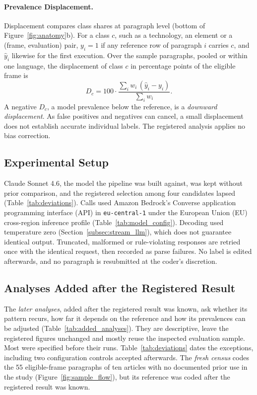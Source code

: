\paragraph{Prevalence Displacement.} Displacement compares class shares at paragraph level (bottom of Figure~\ref{fig:anatomy}b). For a class $c$, such as a technology, an element or a (frame, evaluation) pair, $y_i = 1$ if any reference row of paragraph $i$ carries $c$, and $\hat{y}_i$ likewise for the first execution. Over the sample paragraphs, pooled or within one language, the displacement of class $c$ in percentage points of the eligible frame is
\begin{equation}
D_c = 100 \cdot \frac{\sum_i w_i\,(\hat{y}_i - y_i)}{\sum_i w_i}.
\label{eq:displacement}
\end{equation}
A negative $D_c$, a model prevalence below the reference, is a \emph{downward displacement}. As false positives and negatives can cancel, a small displacement does not establish accurate individual labels. The registered analysis applies no bias correction.

\subsection{Experimental Setup}\label{subsec:experimental_setup}

Claude Sonnet 4.6, the model the pipeline was built against, was kept without prior comparison, and the registered selection among four candidates lapsed (Table~\ref{tab:deviations}). Calls used Amazon Bedrock's Converse application programming interface (API) in \texttt{eu-central-1} under the European Union (EU) cross-region inference profile (Table~\ref{tab:model_config}). Decoding used temperature zero (Section~\ref{subsec:stream_llm}), which does not guarantee identical output. Truncated, malformed or rule-violating responses are retried once with the identical request, then recorded as parse failures. No label is edited afterwards, and no paragraph is resubmitted at the coder's discretion.

\subsection{Analyses Added after the Registered Result}\label{subsec:added_methods}\label{subsec:procedure}

The \emph{later analyses}, added after the registered result was known, ask whether its pattern recurs, how far it depends on the reference and how its prevalences can be adjusted (Table~\ref{tab:added_analyses}). They are descriptive, leave the registered figures unchanged and mostly reuse the inspected evaluation sample. Most were specified before their runs. Table~\ref{tab:deviations} dates the exceptions, including two configuration controls accepted afterwards. The \emph{fresh census} codes the 55 eligible-frame paragraphs of ten articles with no documented prior use in the study (Figure~\ref{fig:sample_flow}), but its reference was coded after the registered result was known.

